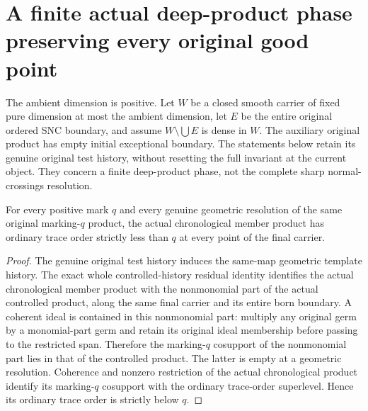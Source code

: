 \section{A finite actual deep-product phase preserving every original good point}

The ambient dimension is positive. Let $W$ be a closed smooth carrier of fixed
pure dimension at most the ambient dimension, let $E$ be the entire original
ordered SNC boundary, and assume $W\setminus\bigcup E$ is dense in $W$.
The auxiliary original product has empty initial exceptional boundary. The
statements below retain its genuine original test history, without resetting
the full invariant at the current object. They concern a finite deep-product
phase, not the complete sharp normal-crossings resolution.

\begin{theorem}
\label{hir:sharp-actual-terminal-marking-chronological-order}
For every positive mark $q$ and every genuine geometric resolution of the
same original marking-$q$ product, the actual chronological member product
has ordinary trace order strictly less than $q$ at every point of the final
carrier.
\end{theorem}
\begin{proof}
The genuine original test history induces the same-map geometric template
history. The exact whole controlled-history residual identity identifies the
actual chronological member product with the nonmonomial part of the actual
controlled product, along the same final carrier and its entire born boundary.
A coherent ideal is contained in this nonmonomial part: multiply any original
germ by a monomial-part germ and retain its original ideal membership before
passing to the restricted span. Therefore the marking-$q$ cosupport of the
nonmonomial part lies in that of the controlled product. The latter is empty
at a geometric resolution. Coherence and nonzero restriction of the actual
chronological product identify its marking-$q$ cosupport with the ordinary
trace-order superlevel. Hence its ordinary trace order is strictly below $q$.
\leanok
\end{proof}

